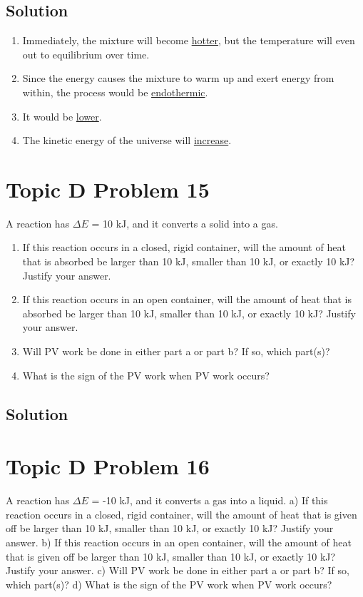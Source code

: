 \documentclass[10pt]{article}
\newcommand{\U}[1]{\underline{#1}}
\begin{document}
        \subsection{Solution}
            \begin{enumerate}[label=\alph*)]
                \item   Immediately, the mixture will become \U{hotter}, but the temperature will even out to equilibrium over time.
                \item   Since the energy causes the mixture to warm up and exert energy from within, the process would be \U{endothermic}.
                \item   It would be \U{lower}.
                \item   The kinetic energy of the universe will \U{increase}. 
            \end{enumerate}

    \pagebreak
    \section{Topic D Problem 15}
        A reaction has $\Delta E$ = 10 kJ, and it converts a solid into a gas.
        \begin{enumerate}[label=\alph*)]
            \item If this reaction occurs in a closed, rigid container, will the amount of heat that is absorbed be larger than 10 kJ, smaller than 10 kJ, or exactly 10 kJ? Justify your answer.
            \item If this reaction occurs in an open container, will the amount of heat that is absorbed be larger than 10 kJ, smaller than 10 kJ, or exactly 10 kJ? Justify your answer.
            \item Will PV work be done in either part a or part b? If so, which part(s)?
            \item What is the sign of the PV work when PV work occurs?
        \end{enumerate}
        
        \subsection{Solution}

    \pagebreak
    \section{Topic D Problem 16}
        A reaction has $\Delta E$ = -10 kJ, and it converts a gas into a liquid.
a) If this reaction occurs in a closed, rigid container, will the amount of heat that is given off
be larger than 10 kJ, smaller than 10 kJ, or exactly 10 kJ? Justify your answer.
b) If this reaction occurs in an open container, will the amount of heat that is given off be
larger than 10 kJ, smaller than 10 kJ, or exactly 10 kJ? Justify your answer.
c) Will PV work be done in either part a or part b? If so, which part(s)?
d) What is the sign of the PV work when PV work occurs?
        
\end{document}
